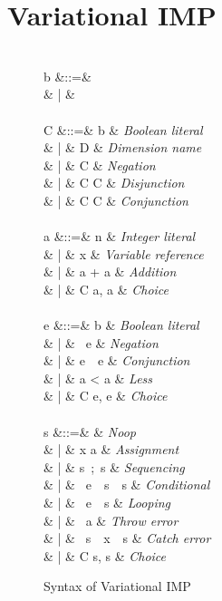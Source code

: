 \documentclass[12pt,oneside]{book}
\newcommand{\tagtree}[3]{#1 \langle #2, #3 \rangle}
\begin{document}
\chapter{Variational IMP}
\label{ch:vimp}

\begin{figure}
\begin{syntax}
 \\
b &::=&  \\
& | &  \\
\\
C &::=& b & \textit{Boolean literal} \\
& | & D & \textit{Dimension name} \\
& | & \neg C & \textit{Negation} \\
& | & C \vee C & \textit{Disjunction} \\
& | & C \wedge C & \textit{Conjunction} \\
\\
a &::=& n & \textit{Integer literal} \\
& | & x & \textit{Variable reference} \\
& | & a + a & \textit{Addition} \\
& | & \tagtree{C}{a}{a} & \textit{Choice} \\
 \\
e &::=& b & \textit{Boolean literal} \\
& | & \ e & \textit{Negation} \\
& | & e\ \ e & \textit{Conjunction} \\
& | & a < a & \textit{Less} \\
& | & \tagtree{C}{e}{e} & \textit{Choice} \\
 \\
s &::=&  & \textit{Noop} \\
& | & x \coloneqq a & \textit{Assignment} \\
& | & s\ ;\ s & \textit{Sequencing} \\
& | & \ e\ \ s\ \ s & \textit{Conditional} \\
& | & \ e\ \ s & \textit{Looping} \\
& | & \ a & \textit{Throw error} \\
& | & \ s\ \ x\ \ s & \textit{Catch error} \\
& | & \tagtree{C}{s}{s} & \textit{Choice}
\end{syntax}
\caption{Syntax of Variational IMP}
\label{fig:vimpsyn}
\end{figure}
\end{document}
